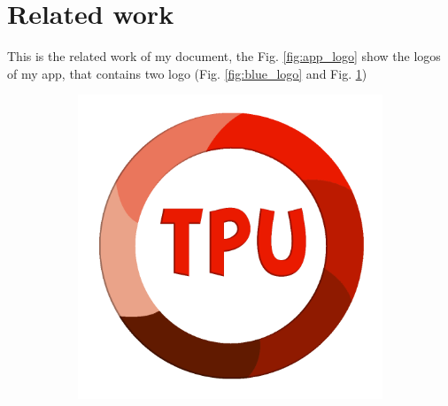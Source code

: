 \documentclass[twocolumn]{article}
\begin{document}
\section{Related work}
This is the related work of my document, the Fig. \ref{fig:app_logo} show the logos of my app, that contains two logo (Fig. \ref{fig:blue_logo} and Fig. \ref{fig:red_logo})


	\begin{figure} %
		\centering
		\begin{subfigure}[b]{0.45\columnwidth}
			\includegraphics[width=\textwidth]{Red.png}
			\caption{}
			\label{fig:red_logo}
		\end{subfigure}
		~ %
		\begin{subfigure}[b]{0.45\columnwidth}

\end{subfigure}
\end{figure}
\end{document}
